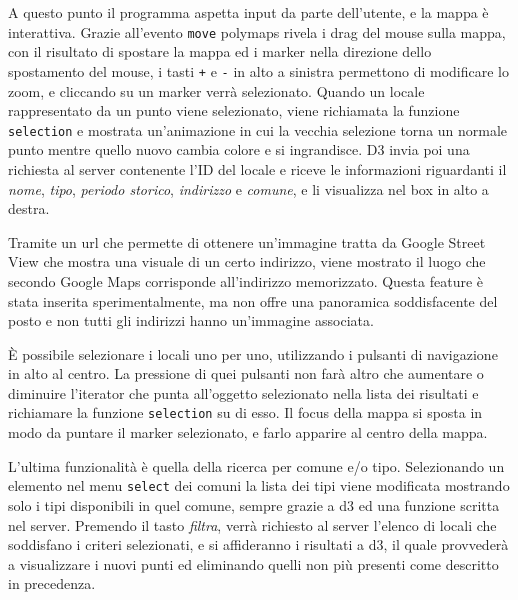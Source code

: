 A questo punto il programma aspetta input da parte dell'utente, e la mappa è interattiva. Grazie all'evento \texttt{move} polymaps rivela i drag del mouse sulla mappa, con il risultato di spostare la mappa ed i marker nella direzione dello spostamento del mouse, i tasti \texttt{+} e \texttt{-} in alto a sinistra permettono di modificare lo zoom, e cliccando su un marker verrà selezionato.
Quando un locale rappresentato da un punto viene selezionato, viene richiamata la funzione \texttt{selection} e mostrata un'animazione in cui la vecchia selezione torna un normale punto mentre quello nuovo cambia colore e si ingrandisce. D3 invia poi una richiesta al server contenente l'ID del locale e riceve le informazioni riguardanti il \emph{nome}, \emph{tipo}, \emph{periodo storico}, \emph{indirizzo} e \emph{comune}, e li visualizza nel box in alto a destra. 

Tramite un url che permette di ottenere un'immagine tratta da Google Street View che mostra una visuale di un certo indirizzo, viene mostrato il luogo che secondo Google Maps corrisponde all'indirizzo memorizzato. Questa feature è stata inserita sperimentalmente, ma non offre una panoramica soddisfacente del posto e non tutti gli indirizzi hanno un'immagine associata.

\`E possibile selezionare i locali uno per uno, utilizzando i pulsanti di navigazione in alto al centro. La pressione di quei pulsanti non farà altro che aumentare o diminuire l'iterator che punta all'oggetto selezionato nella lista dei risultati e richiamare la funzione \texttt{selection} su di esso. \label{sec:riposizionamento}Il focus della mappa si sposta in modo da puntare il marker selezionato, e farlo apparire al centro della mappa.

L'ultima funzionalità è quella della ricerca per comune e/o tipo. Selezionando un elemento nel menu \texttt{select} dei comuni la lista dei tipi viene modificata mostrando solo i tipi disponibili in quel comune, sempre grazie a d3 ed una funzione scritta nel server. Premendo il tasto \emph{filtra}, verrà richiesto al server l'elenco di locali che soddisfano i criteri selezionati, e si affideranno i risultati a d3, il quale provvederà a visualizzare i nuovi punti ed eliminando quelli non più presenti come descritto in precedenza.

